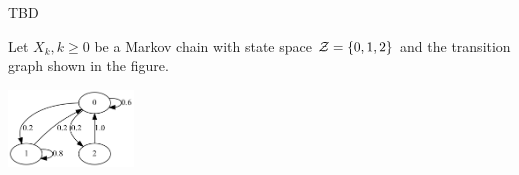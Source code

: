 \ifspanish
TBD
\else

Let ${X_k, k \ge 0}$ be a Markov chain with state space ${\cal Z} = \{0, 1, 2\}$ and the transition graph shown in the figure.
\begin{center}
\centering
\includegraphics[width=0.25\textwidth]{./db/figs/MC_2023.png}
\end{center}



